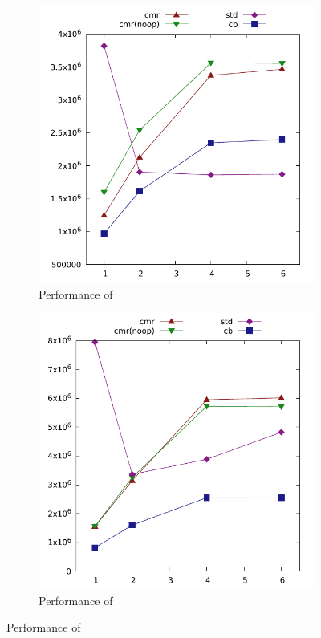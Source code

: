 \begin{figure}[ht]
\centering
  \begin{subfigure}{0.49\linewidth}
    \includegraphics[width=\linewidth]{graphs/lurifax-hm-insert.pdf}
    \caption{Performance of }
  \end{subfigure}
  \begin{subfigure}{0.49\linewidth}
    \includegraphics[width=\linewidth]{graphs/lurifax-hm-contains.pdf}
    \caption{Performance of }
  \end{subfigure}
\end{figure}


